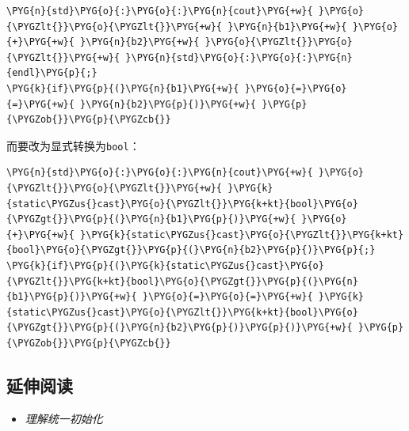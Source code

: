 
\begin{codeblockbg}
\begin{Verbatim}[commandchars=\\\{\},breaklines=true,breakanywhere=true,fontsize=\codefont,xleftmargin=17bp]
\PYG{n}{std}\PYG{o}{:}\PYG{o}{:}\PYG{n}{cout}\PYG{+w}{ }\PYG{o}{\PYGZlt{}}\PYG{o}{\PYGZlt{}}\PYG{+w}{ }\PYG{n}{b1}\PYG{+w}{ }\PYG{o}{+}\PYG{+w}{ }\PYG{n}{b2}\PYG{+w}{ }\PYG{o}{\PYGZlt{}}\PYG{o}{\PYGZlt{}}\PYG{+w}{ }\PYG{n}{std}\PYG{o}{:}\PYG{o}{:}\PYG{n}{endl}\PYG{p}{;}
\PYG{k}{if}\PYG{p}{(}\PYG{n}{b1}\PYG{+w}{ }\PYG{o}{=}\PYG{o}{=}\PYG{+w}{ }\PYG{n}{b2}\PYG{p}{)}\PYG{+w}{ }\PYG{p}{\PYGZob{}}\PYG{p}{\PYGZcb{}}
\end{Verbatim}
\end{codeblockbg}



而要改为显式转换为\texttt{bool}：



\begin{codeblockbg}
\begin{Verbatim}[commandchars=\\\{\},breaklines=true,breakanywhere=true,fontsize=\codefont,xleftmargin=17bp]
\PYG{n}{std}\PYG{o}{:}\PYG{o}{:}\PYG{n}{cout}\PYG{+w}{ }\PYG{o}{\PYGZlt{}}\PYG{o}{\PYGZlt{}}\PYG{+w}{ }\PYG{k}{static\PYGZus{}cast}\PYG{o}{\PYGZlt{}}\PYG{k+kt}{bool}\PYG{o}{\PYGZgt{}}\PYG{p}{(}\PYG{n}{b1}\PYG{p}{)}\PYG{+w}{ }\PYG{o}{+}\PYG{+w}{ }\PYG{k}{static\PYGZus{}cast}\PYG{o}{\PYGZlt{}}\PYG{k+kt}{bool}\PYG{o}{\PYGZgt{}}\PYG{p}{(}\PYG{n}{b2}\PYG{p}{)}\PYG{p}{;}
\PYG{k}{if}\PYG{p}{(}\PYG{k}{static\PYGZus{}cast}\PYG{o}{\PYGZlt{}}\PYG{k+kt}{bool}\PYG{o}{\PYGZgt{}}\PYG{p}{(}\PYG{n}{b1}\PYG{p}{)}\PYG{+w}{ }\PYG{o}{=}\PYG{o}{=}\PYG{+w}{ }\PYG{k}{static\PYGZus{}cast}\PYG{o}{\PYGZlt{}}\PYG{k+kt}{bool}\PYG{o}{\PYGZgt{}}\PYG{p}{(}\PYG{n}{b2}\PYG{p}{)}\PYG{p}{)}\PYG{+w}{ }\PYG{p}{\PYGZob{}}\PYG{p}{\PYGZcb{}}
\end{Verbatim}
\end{codeblockbg}



\subsection{延伸阅读}



\begin{itemize}
\item \textit{理解统一初始化}

\end{itemize}


